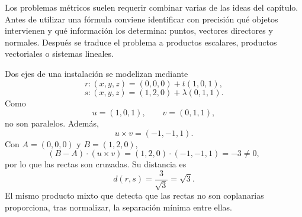 Los problemas métricos suelen requerir combinar varias de las ideas del capítulo. Antes de utilizar una fórmula conviene identificar con precisión qué objetos intervienen y qué información los determina: puntos, vectores directores y normales. Después se traduce el problema a productos escalares, productos vectoriales o sistemas lineales.

\begin{example}
Dos ejes de una instalación se modelizan mediante
\[
r:(x,y,z)=(0,0,0)+t(1,0,1),
\]
\[
s:(x,y,z)=(1,2,0)+\lambda(0,1,1).
\]
Como
\[
u=(1,0,1),\qquad v=(0,1,1),
\]
no son paralelos. Además,
\[
u\times v=(-1,-1,1).
\]
Con $A=(0,0,0)$ y $B=(1,2,0)$,
\[
(B-A)\cdot(u\times v)
=(1,2,0)\cdot(-1,-1,1)=-3\neq0,
\]
por lo que las rectas son cruzadas. Su distancia es
\[
d(r,s)
=\frac{3}{\sqrt3}
=\boxed{\sqrt3}.
\]
El mismo producto mixto que detecta que las rectas no son coplanarias proporciona, tras normalizar, la separación mínima entre ellas.
\end{example}
